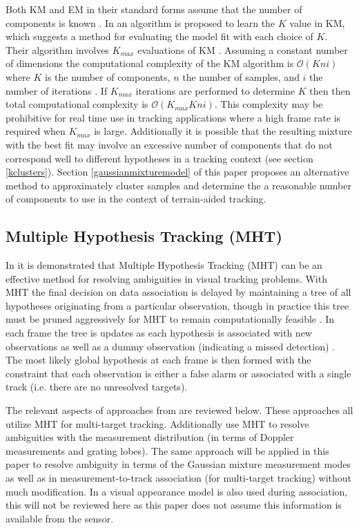 \documentclass[journal]{IEEEtran}
\begin{document}
Both KM and EM in their standard forms assume that the number of components is known \cite{hamerly2004learning}. In \cite{hamerly2004learning} an algorithm is proposed to learn the $K$ value in KM, which suggests a method for evaluating the model fit with each choice of $K$. Their algorithm involves $K_{max}$ evaluations of KM \cite{hamerly2004learning}. Assuming a constant number of dimensions the computational complexity of the KM algorithm is $\mathcal{O}(Kni)$ where $K$ is the number of components, $n$ the number of samples, and $i$ the number of iterations \cite{hartigan1979algorithm}. If $K_{max}$ iterations are performed to determine $K$ then then total computational complexity is $\mathcal{O}(K_{max} K n i)$. This complexity may be prohibitive for real time use in tracking applications where a high frame rate is required when $K_{max}$ is large. Additionally it is possible that the resulting mixture with the best fit may involve an excessive number of components that do not correspond well to different hypotheses in a tracking context (see section \ref{kclusters}). Section \ref{gaussianmixturemodel} of this paper proposes an alternative method to approximately cluster samples and determine the a reasonable number of components to use in the context of terrain-aided tracking.

\subsection{Multiple Hypothesis Tracking (MHT)} \label{backgroundmht}
In \cite{kim2015multiple} it is demonstrated that Multiple Hypothesis Tracking (MHT) can be an effective method for resolving ambiguities in visual tracking problems. With MHT the final decision on data association is delayed by maintaining a tree of all hypotheses originating from a particular observation, though in practice this tree must be pruned aggressively for MHT to remain computationally feasible \cite{kim2015multiple}. In each frame the tree is updates as each hypothesis is associated with new observations as well as a dummy observation (indicating a missed detection) \cite{kim2015multiple}. The most likely global hypothesis at each frame is then formed with the constraint that each observation is either a false alarm or associated with a single track (i.e. there are no unresolved targets).

The relevant aspects of approaches from \cite{kim2015multiple, li2013multitarget, yamada2017multi} are reviewed below. These approaches all utilize MHT for multi-target tracking. Additionally \cite{li2013multitarget, yamada2017multi} use MHT to resolve ambiguities with the measurement distribution (in terms of Doppler measurements and grating lobes). The same approach will be applied in this paper to resolve ambiguity in terms of the Gaussian mixture measurement modes as well as in measurement-to-track association (for multi-target tracking) without much modification. In \cite{kim2015multiple} a visual appearance model is also used during association, this will not be reviewed here as this paper does not assume this information is available from the sensor.
\end{document}
